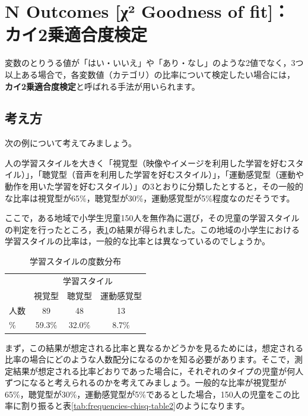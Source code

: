 \documentclass[
  12pt,
  a5jpaper,
  lualatex, ja=standard]{bxjsbook}
\renewcommand{\emph}[1]{\textbf{\color{emph} #1}}
\begin{document}
\hypertarget{sec:frequencies-n-outomes}{%
\section{N Outcomes {[}χ² Goodness of fit{]}：カイ2乗適合度検定}\label{sec:frequencies-n-outomes}}

変数のとりうる値が「はい・いいえ」や「あり・なし」のような2値でなく，3つ以上ある場合で，各変数値（カテゴリ）の比率について検定したい場合には，\emph{カイ2乗適合度検定}と呼ばれる手法が用いられます。

\hypertarget{sub:frequencies-n-outomes-basics}{%
\subsection{考え方}\label{sub:frequencies-n-outomes-basics}}

次の例について考えてみましょう。

人の学習スタイルを大きく「視覚型（映像やイメージを利用した学習を好むスタイル）」，「聴覚型（音声を利用した学習を好むスタイル）」，「運動感覚型（運動や動作を用いた学習を好むスタイル）」の3とおりに分類したとすると，その一般的な比率は視覚型が65\%，聴覚型が30\%，運動感覚型が5\%程度なのだそうです。

ここで，ある地域で小学生児童150人を無作為に選び，その児童の学習スタイルの判定を行ったところ，表\ref{tab:frequencies-chisq-table1}の結果が得られました。この地域の小学生における学習スタイルの比率は，一般的な比率とは異なっているのでしょうか。

\begin{table}[H]

\caption{\label{tab:frequencies-chisq-table1}学習スタイルの度数分布}
\centering
\begin{tabular}[t]{lccc}
\toprule
\multicolumn{1}{c}{ } & \multicolumn{3}{c}{学習スタイル} \\
\cmidrule(l{3pt}r{3pt}){2-4}
  & 視覚型 & 聴覚型 & 運動感覚型\\
\midrule
人数 & 89 & 48 & 13\\
\% & 59.3\% & 32.0\% & 8.7\%\\
\bottomrule
\end{tabular}
\end{table}

まず，この結果が想定される比率と異なるかどうかを見るためには，想定される比率の場合にどのような人数配分になるのかを知る必要があります。そこで，測定結果が想定される比率どおりであった場合に，それぞれのタイプの児童が何人ずつになると考えられるのかを考えてみましょう。一般的な比率が視覚型が65\%，聴覚型が30\%，運動感覚型が5\%であるとした場合，150人の児童をこの比率に割り振ると表\ref{tab:frequencies-chisq-table2}のようになります。
\end{document}
